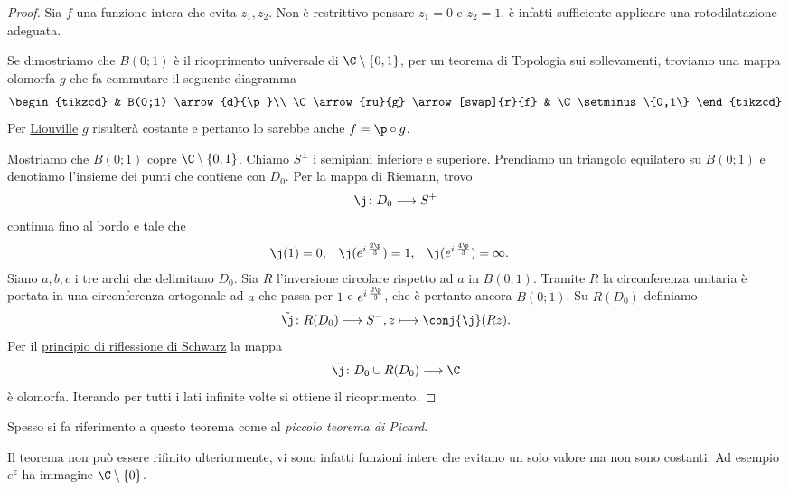 \begin{proof}
	Sia \(f\) una funzione intera che evita \(z_1,z_2\). Non è restrittivo pensare \(z_1=0\) e \(z_2=1\), è infatti sufficiente applicare una rotodilatazione adeguata.
	
	Se dimostriamo che \(B(0;1)\) è il ricoprimento universale di \(\C\setminus\{0,1\}\), per un teorema di Topologia sui sollevamenti, troviamo una mappa olomorfa \(g\) che fa commutare il seguente diagramma
	\[
		\begin{tikzcd}
			& B(0;1) \arrow{d}{\p}\\
			\C \arrow{ru}{g} \arrow[swap]{r}{f} & \C\setminus\{0,1\}
		\end{tikzcd}
	\]
	Per \hyperref[th:teoremaLiouville]{Liouville} \(g\) risulterà costante e pertanto lo sarebbe anche \(f=\p\circ g\).
	
	Mostriamo che \(B(0;1)\) copre \(\C\setminus\{0,1\}\). Chiamo \(S^{\pm}\) i semipiani inferiore e superiore.
	Prendiamo un triangolo equilatero su \(B(0;1)\) e denotiamo l'insieme dei punti che contiene con \(D_0\).
	Per la mappa di Riemann, trovo
	\[
		\j\colon D_0 \longrightarrow S^+
	\]
	continua fino al bordo e tale che
	\begin{align*}
		\j(1) & = 0, & \j(e^{i\,\frac{2\p}{3}}) & = 1, & \j(e^{i\,\frac{4\p}{3}}) & = \infty.
	\end{align*}
	Siano \(a,b,c\) i tre archi che delimitano \(D_0\).
	Sia \(R\) l'inversione circolare rispetto ad \(a\) in \(B(0;1)\). Tramite \(R\) la circonferenza unitaria è portata in una circonferenza ortogonale ad \(a\) che passa per \(1\) e \(e^{i\,\frac{2\p}{3}}\), che è pertanto ancora \(B(0;1)\).
	Su \(R(D_0)\) definiamo
	\[
		\tilde{\j}\colon R(D_0) \longrightarrow S^-, z \longmapsto \conj{\j}(Rz).
	\]
	Per il \hyperref[th:principioRiflessioneSchwarz]{principio di riflessione di Schwarz} la mappa
	\[
		\tilde{\j}\colon D_0\cup R(D_0) \longrightarrow \C
	\]
	è olomorfa.
	Iterando per tutti i lati infinite volte si ottiene il ricoprimento.
\end{proof}

\begin{notz}
	Spesso si fa riferimento a questo teorema come al \emph{piccolo teorema di Picard}.
\end{notz}

\begin{oss}
	Il teorema non può essere rifinito ulteriormente, vi sono infatti funzioni intere che evitano un solo valore ma non sono costanti. Ad esempio \(e^z\) ha immagine \(\C\setminus\{0\}\).
\end{oss}